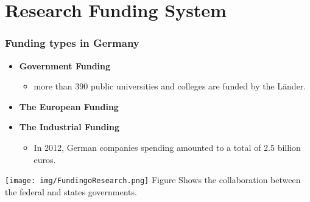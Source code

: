 \documentclass[9pt, compress]{beamer}
\begin{document}
    \section{Research Funding System }
    \begin{frame} 
        \frametitle{Funding types in Germany}
        \begin{itemize}
            \item\textbf{ Government Funding}
                \begin{itemize}
                    \item more than 390 public universities and colleges are funded by the Länder.
                \end{itemize}
        \end{itemize}
    
            \begin{itemize}
                \item\textbf{ The European Funding}
            \end{itemize}
            \begin{itemize}
                \item\textbf{ The Industrial Funding}
                            \begin{itemize}
                                \item  In 2012, German companies  spending amounted to a total of 2.5 billion euros.
                            \end{itemize}
            \end{itemize}

    \end{frame}
    \begin{frame} 
        \texttt{[image: img/FundingoResearch.png]}
        \newline
        \centering
        Figure Shows the collaboration between the federal and states governments.
    \end{frame}
\end{document}
